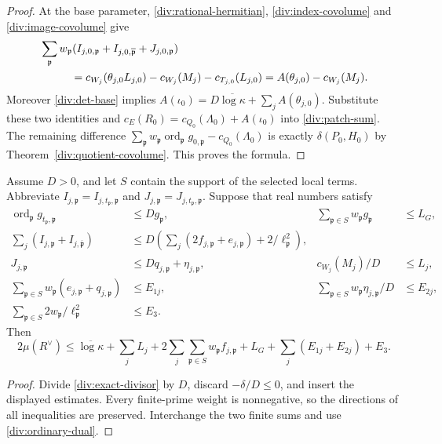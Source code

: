 \begin{proof}
At the base parameter, \eqref{div:rational-hermitian},
\eqref{div:index-covolume} and \eqref{div:image-covolume} give
\begin{align*}
 &\sum_{\mathfrak p}w_{\mathfrak p}
     (I_{j,0,\mathfrak p}+I_{j,0,\overline{\mathfrak p}}
                                   +J_{j,0,\mathfrak p})\\
 &\hspace{10mm}=c_{W_j}(\theta_{j,0}L_{j,0})-c_{W_j}(M_j)
                                     -c_{T_{j,0}}(L_{j,0})
  =A(\theta_{j,0})-c_{W_j}(M_j).
\end{align*}
Moreover \eqref{div:det-base} implies
$A(\iota_0)=D\overline{\log\kappa}+\sum_jA(\theta_{j,0})$.
Substitute these two identities and
$c_E(R_0)=c_{Q_0}(\Lambda_0)+A(\iota_0)$ into
\eqref{div:patch-sum}. The remaining difference
$\sum_{\mathfrak p}w_{\mathfrak p}
\operatorname{ord}_{\mathfrak p}g_{0,\mathfrak p}
-c_{Q_0}(\Lambda_0)$ is exactly $\delta(P_0,H_0)$ by
Theorem~\ref{div:quotient-covolume}. This proves the formula.
\end{proof}

\begin{corollary}\label{div:scalar-divisor}
Assume $D>0$, and let $S$ contain the support of the selected local
terms. Abbreviate $I_{j,\mathfrak p}=I_{j,t_{\mathfrak p},\mathfrak p}$
and $J_{j,\mathfrak p}=J_{j,t_{\mathfrak p},\mathfrak p}$.
Suppose that real numbers satisfy
\begin{align*}
 \operatorname{ord}_{\mathfrak p}g_{t_{\mathfrak p},\mathfrak p}
       &\le Dg_{\mathfrak p},
 &\sum_{\mathfrak p\in S}w_{\mathfrak p}g_{\mathfrak p}&\le L_G,\\
 \sum_j(I_{j,\mathfrak p}+I_{j,\overline{\mathfrak p}})
       &\le D\left(\sum_j(2f_{j,\mathfrak p}+e_{j,\mathfrak p})
                                      +2/\ell_{\mathfrak p}^2\right),\\
 J_{j,\mathfrak p}&\le Dq_{j,\mathfrak p}+\eta_{j,\mathfrak p},
 &c_{W_j}(M_j)/D&\le L_j,\\
 \sum_{\mathfrak p\in S}w_{\mathfrak p}
                     (e_{j,\mathfrak p}+q_{j,\mathfrak p})&\le E_{1j},
 &\sum_{\mathfrak p\in S}w_{\mathfrak p}\eta_{j,\mathfrak p}/D&\le E_{2j},\\
 \sum_{\mathfrak p\in S}2w_{\mathfrak p}/\ell_{\mathfrak p}^2&\le E_3.
\end{align*}
Then
\begin{equation}\label{div:final-divisor}
 2\mu(R^\vee)\le\overline{\log\kappa}+\sum_jL_j
   +2\sum_j\sum_{\mathfrak p\in S}w_{\mathfrak p}f_{j,\mathfrak p}
   +L_G+\sum_j(E_{1j}+E_{2j})+E_3.
\end{equation}
\end{corollary}
\begin{proof}
Divide \eqref{div:exact-divisor} by $D$, discard $-\delta/D\le0$,
and insert the displayed estimates. Every finite-prime weight is
nonnegative, so the directions of all inequalities are preserved.
Interchange the two finite sums and use \eqref{div:ordinary-dual}.
\end{proof}

